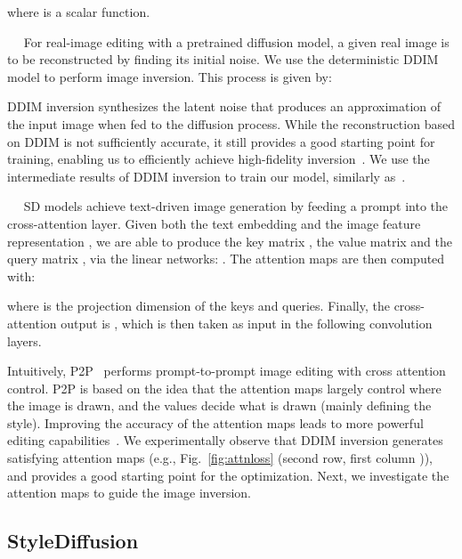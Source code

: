 \documentclass[twocolumn]{svjour3}          \smartqed  \usepackage{graphicx}
\newcommand{\minisection}[1]{\vspace{0.04in} \noindent {\bf #1}\ \ }
\begin{document}
 where   is a scalar function.


\minisection{DDIM inversion.} For real-image editing with a pretrained diffusion model, a given real image is to be reconstructed by finding its initial noise. 
 We use the deterministic DDIM model to perform image inversion.  
 This process is given by:

 DDIM inversion synthesizes the latent noise that produces an approximation of the input image when fed to the diffusion process. While the reconstruction based on DDIM is not sufficiently accurate,  it still provides a good starting point for training, enabling us to efficiently achieve high-fidelity  inversion~\citep{hertz2022prompt}. We use  the intermediate results of DDIM inversion to train our model, similarly as~\citep{couairon2022diffedit,mokady2022null}.


\minisection{Cross-attention.} SD models achieve text-driven image generation by feeding a prompt into the cross-attention layer.  Given both the text embedding  and  the image feature representation ,  
we are able to produce the key matrix ,  the value matrix  and the query matrix ,  via the  linear networks:  . The attention maps are then  computed with:

where  is the projection dimension of the keys and queries.  Finally, the cross-attention output is , which is then taken as input in the following  convolution layers. 


Intuitively, P2P~\citep{hertz2022prompt} performs prompt-to-prompt image editing  with cross attention control. P2P is based on the idea that the attention maps largely control where the image is drawn, and the values decide what is drawn (mainly defining the style). 
Improving the accuracy of the attention maps leads to more powerful editing capabilities~\citep{mokady2022null}.
  We experimentally observe that DDIM inversion generates satisfying attention maps (e.g., Fig.~\ref{fig:attnloss} (second row, first column )), 
and provides a good starting point for the optimization. Next, we investigate the attention maps to guide the image inversion.

\subsection{StyleDiffusion}
\label{subsec:stylediffusion}
\end{document}
